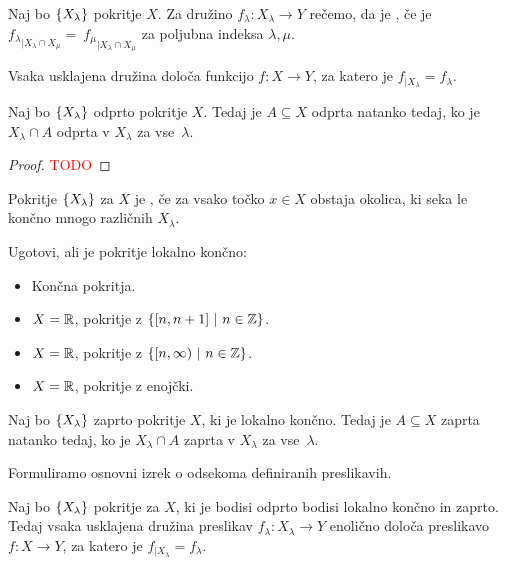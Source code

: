\begin{definicija}
    Naj bo $\left\{X_\lambda\right\}$ pokritje $X$. Za družino $f_\lambda: X_\lambda \to Y$ rečemo, da je , če je ${f_\lambda}_{|X_\lambda \cap X_\mu} =~{f_\mu}_{|X_\lambda \cap X_\mu}$ za poljubna indeksa $\lambda, \mu$.
\end{definicija}

\begin{trditev}
    Vsaka usklajena družina določa funkcijo $f: X \to Y$, za katero je $f_{|X_\lambda} = f_\lambda$.
\end{trditev}

\begin{lema}
    Naj bo $\left\{X_\lambda\right\}$ odprto pokritje $X$. Tedaj je $A \subseteq X$ odprta natanko tedaj, ko je $X_\lambda \cap A$ odprta v $X_\lambda$ za vse~$\lambda$.
\end{lema}

\begin{proof}
    \textcolor{red}{TODO}
\end{proof}

\begin{definicija}
    Pokritje $\left\{X_\lambda\right\}$ za $X$ je , če za vsako točko $x \in X$ obstaja okolica, ki seka le končno mnogo različnih $X_\lambda$.
\end{definicija}

\begin{primer}
    Ugotovi, ali je pokritje lokalno končno:
    \begin{itemize}
        \item Končna pokritja.
        \item $X = \mathbb{R}$, pokritje z $\left\{[n, n+1] \ | \ n \in \mathbb{Z}\right\}$.
        \item $X = \mathbb{R}$, pokritje z $\left\{[n, \infty) \ | \ n \in \mathbb{Z}\right\}$.
        \item $X = \mathbb{R}$, pokritje z enojčki.
    \end{itemize}
\end{primer}

\begin{lema}
    Naj bo $\left\{X_\lambda\right\}$ zaprto pokritje $X$, ki je lokalno končno. Tedaj je $A \subseteq X$ zaprta natanko tedaj, ko je $X_\lambda \cap A$ zaprta v $X_\lambda$ za vse~$\lambda$.
\end{lema}

Formuliramo osnovni izrek o odsekoma definiranih preslikavih.
\begin{izrek}
    Naj bo $\left\{X_\lambda\right\}$ pokritje za $X$, ki je bodisi odprto bodisi lokalno končno in zaprto. Tedaj vsaka usklajena družina preslikav $f_\lambda: X_\lambda \to Y$ enolično določa preslikavo $f: X \to Y$, za katero je $f_{|X_\lambda} = f_\lambda$.
\end{izrek}

